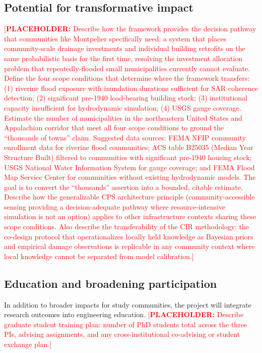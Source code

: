 \documentclass[11pt]{article}
\newcommand{\placeholder}[1]{\textcolor{red}{[\textbf{PLACEHOLDER:} #1]}}
\begin{document}
\vspace{-10pt}
\subsection{Potential for transformative impact}
\placeholder{Describe how the framework provides the decision pathway that communities like Montpelier specifically need: a system that places community-scale drainage investments and individual building retrofits on the same probabilistic basis for the first time, resolving the investment allocation problem that repeatedly-flooded small municipalities currently cannot evaluate. Define the four scope conditions that determine where the framework transfers: (1) riverine flood exposure with inundation durations sufficient for SAR coherence detection; (2) significant pre-1940 load-bearing building stock; (3) institutional capacity insufficient for hydrodynamic simulation; (4) USGS gauge coverage. Estimate the number of municipalities in the northeastern United States and Appalachian corridor that meet all four scope conditions to ground the ``thousands of towns'' claim. Suggested data sources: FEMA NFIP community enrollment data for riverine flood communities; ACS table B25035 (Median Year Structure Built) filtered to communities with significant pre-1940 housing stock; USGS National Water Information System for gauge coverage; and FEMA Flood Map Service Center for communities without existing hydrodynamic models. The goal is to convert the ``thousands'' assertion into a bounded, citable estimate. Describe how the generalizable CPS architecture principle (community-accessible sensing providing a decision-adequate pathway where resource-intensive simulation is not an option) applies to other infrastructure contexts sharing these scope conditions. Also describe the transferability of the CIR methodology: the co-design protocol that operationalizes locally held knowledge as Bayesian priors and empirical damage observations is replicable in any community context where local knowledge cannot be separated from model calibration.}

\vspace{-10pt}
\subsection{Education and broadening participation}

In addition to broader impacts for study communities, the project will integrate research outcomes into engineering education.
\placeholder{Describe graduate student training plan: number of PhD students total across the three PIs, advising assignments, and any cross-institutional co-advising or student exchange plan.}
\end{document}

